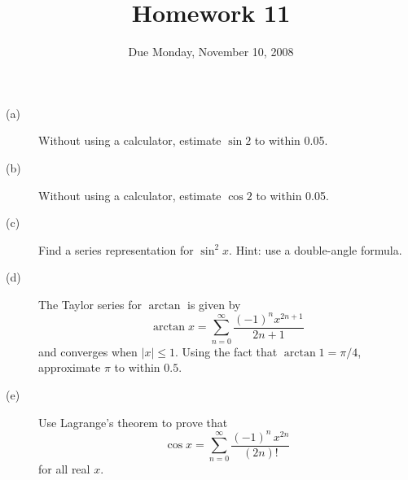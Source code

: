 \documentclass[12pt]{article}
\title{Homework 11}
\date{Due Monday, November 10, 2008}
\begin{document}
\maketitle

\begin{description}

\item[(a)] Without using a calculator, estimate $\sin 2$ to within 0.05.

\vfill

\item[(b)] Without using a calculator, estimate $\cos 2$ to within 0.05.

\vfill

\item[(c)] Find a series representation for $\sin^2 x$.  Hint: use a double-angle formula.

\vfill

\item[(d)]  The Taylor series for $\arctan$ is given by
$$
\arctan x = \sum_{n=0}^\infty \frac{(-1)^n x^{2n+1}}{2n + 1}
$$
and converges when $|x| \leq 1$.  Using the fact that $\arctan 1 = \pi/4$, approximate $\pi$ to within $0.5$.

\vfill

\item[(e)] Use Lagrange's theorem to prove that
$$
\cos x = \sum_{n=0}^\infty \frac{(-1)^n \, x^{2n}}{(2n)!}
$$
for all real $x$.

\vfill

\end{description}
\end{document}

